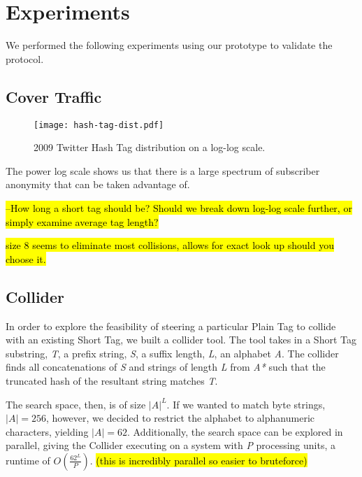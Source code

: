 \section{Experiments}

We performed the following experiments using our prototype to validate the protocol.

\subsection{Cover Traffic}

\begin{figure}
\begin{center}
\texttt{[image: hash-tag-dist.pdf]}
\caption{2009 Twitter Hash Tag distribution on a log-log scale.
\label{fig:hash-dist}
}
\end{center}
\end{figure}

The power log scale shows us that there is a large spectrum of subscriber anonymity that can be taken advantage of. 

\hl{--How long a short tag should be? Should we break down log-log scale further, or simply examine average tag length?}

\hl{size 8 seems to eliminate most collisions, allows for exact look up should you choose it.}

\subsection{Collider}

In order to explore the feasibility of steering a particular Plain Tag to collide with an existing Short Tag, we built a collider tool. The tool takes in a Short Tag substring, \textit{T}, a prefix string, \textit{S}, a suffix length, \textit{L}, an alphabet 
\textit{A}. The collider finds all concatenations of \textit{S} and strings of length \textit{L} from \textit{A*} such that the truncated hash of the resultant string matches \textit{T}.

The search space, then, is of size $|A|^L$. If we wanted to match byte strings, $|A| = 256$, however, we decided to restrict the alphabet to alphanumeric characters, yielding $|A| = 62$. Additionally, the search space can be explored in parallel, giving the Collider executing on a system with \textit{P} processing units, a runtime of $O(\frac{62^L}{P})$. \hl{(this is incredibly parallel so easier to bruteforce)}

